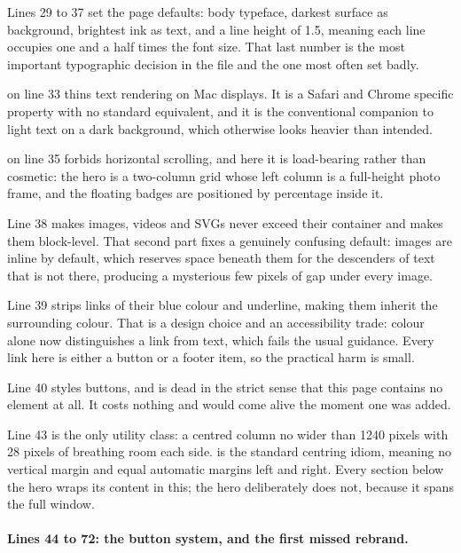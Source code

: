 Lines 29 to 37 set the page defaults: body typeface, darkest surface as background,
brightest ink as text, and a line height of 1.5, meaning each line occupies one and
a half times the font size. That last number is the most important typographic
decision in the file and the one most often set badly.

 on line 33 thins text rendering on Mac
displays. It is a Safari and Chrome specific property with no standard equivalent,
and it is the conventional companion to light text on a dark background, which
otherwise looks heavier than intended.

 on line 35 forbids horizontal scrolling, and here it is
load-bearing rather than cosmetic: the hero is a two-column grid whose left column
is a full-height photo frame, and the floating badges are positioned by percentage
inside it.

Line 38 makes images, videos and SVGs never exceed their container and makes them
block-level. That second part fixes a genuinely confusing default: images are
inline by default, which reserves space beneath them for the descenders of text
that is not there, producing a mysterious few pixels of gap under every image.

Line 39 strips links of their blue colour and underline, making them inherit the
surrounding colour. That is a design choice and an accessibility trade: colour
alone now distinguishes a link from text, which fails the usual guidance. Every
link here is either a button or a footer item, so the practical harm is small.

Line 40 styles buttons, and is dead in the strict sense that this page contains no
 element at all. It costs nothing and would come alive the moment one
was added.

Line 43 is the only utility class: a centred column no wider than 1240 pixels with
28 pixels of breathing room each side.  is the standard
centring idiom, meaning no vertical margin and equal automatic margins left and
right. Every section below the hero wraps its content in this; the hero
deliberately does not, because it spans the full window.

\paragraph{Lines 44 to 72: the button system, and the first missed rebrand.}

